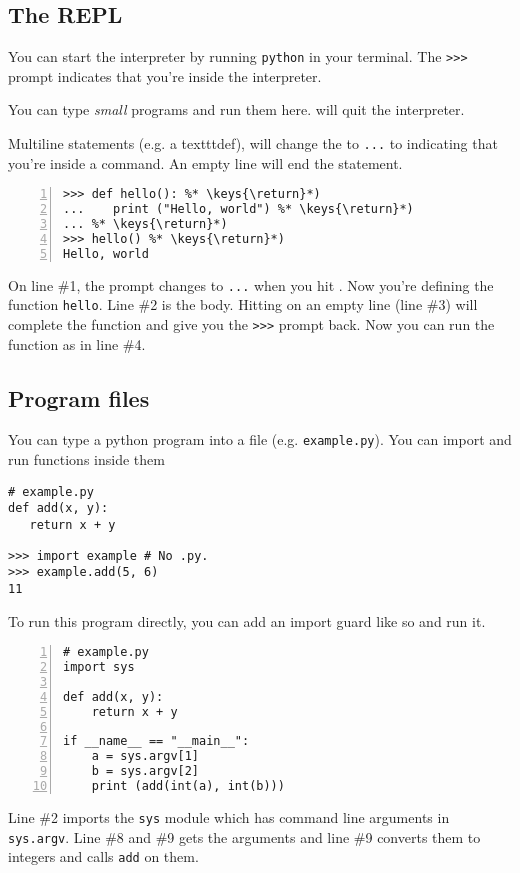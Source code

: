 \subsection{The REPL}
You can start the interpreter by running \texttt{python} in your
terminal. The \texttt{>>>} prompt indicates that you're inside the
interpreter. 

You can type \emph{small} programs and run them here.  will
quit the interpreter.

Multiline statements (e.g. a texttt{def}), will change the to \texttt{...} to
indicating that you're inside a command. An empty line will end the
statement.

\begin{lstlisting}[numbers=left, numberstyle=\tiny\color{gray}, xleftmargin={0.75cm}]
>>> def hello(): %* \keys{\return}*)
...    print ("Hello, world") %* \keys{\return}*)
... %* \keys{\return}*)
>>> hello() %* \keys{\return}*)
Hello, world
\end{lstlisting}

On line \#1, the prompt changes to \texttt{...} when you hit
\keys{\return}. Now you're defining the function \texttt{hello}. Line
\#2 is the body. Hitting \keys{\return} on an empty line (line \#3) will
complete the function and give you the \texttt{>>>} prompt back. Now
you can run the function as in line \#4.

\subsection{Program files}
You can type a python program into a file
(e.g. \texttt{example.py}). You can import and run functions inside
them  

\begin {lstlisting}
# example.py 
def add(x, y):
   return x + y
\end{lstlisting}

\begin {lstlisting}
>>> import example # No .py. 
>>> example.add(5, 6)
11
\end{lstlisting}

To run this program directly, you can add an import guard like so and
run it.

\begin {lstlisting}[numbers=left, numberstyle=\tiny\color{gray}, xleftmargin={0.75cm}]
# example.py 
import sys

def add(x, y):
    return x + y

if __name__ == "__main__":
    a = sys.argv[1]
    b = sys.argv[2]
    print (add(int(a), int(b)))
\end{lstlisting}

Line \#2 imports the \texttt{sys} module which has command line
arguments in \texttt{sys.argv}. Line \#8 and \#9 gets the arguments
and line \#9 converts them to integers and calls \texttt{add} on them.












